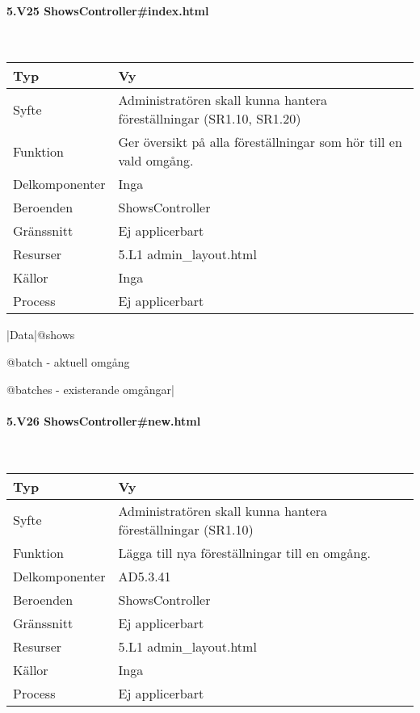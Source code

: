 \documentclass[a4paper, twoside, 11pt, titlepage]{article}
\begin{document}
			\paragraph{5.V25 ShowsController\#index.html}\

			\begin {table} [ht] \begin{tabular} {  p{3.5cm} p{9.6cm} }
				\hline
				Typ & Vy  \\
				\hline
				Syfte & Administratören skall kunna hantera föreställningar (SR1.10, SR1.20)  \\
				\hline
				Funktion & Ger översikt på alla föreställningar som hör till en vald omgång.  \\
				\hline
				Delkomponenter & Inga  \\
				\hline
				Beroenden & ShowsController  \\
				\hline
				Gränssnitt & Ej applicerbart  \\
				\hline
				Resurser & 5.L1 admin\_layout.html  \\
				\hline
				Källor & Inga  \\
				\hline
				Process & Ej applicerbart  \\
				\hline
			\end{tabular} \end{table} \FloatBarrier
			\vspace{6mm}

			|Data|@shows

			@batch - aktuell omgång

			@batches - existerande omgångar|

			\paragraph{5.V26 ShowsController\#new.html}\

			\begin {table} [ht] \begin{tabular} {  p{3.5cm} p{9.6cm} }
				\hline
				Typ & Vy  \\
				\hline
				Syfte & Administratören skall kunna hantera föreställningar (SR1.10)  \\
				\hline
				Funktion & Lägga till nya föreställningar till en omgång.  \\
				\hline
				Delkomponenter & AD5.3.41  \\
				\hline
				Beroenden & ShowsController  \\
				\hline
				Gränssnitt & Ej applicerbart  \\
				\hline
				Resurser & 5.L1 admin\_layout.html  \\
				\hline
				Källor & Inga  \\
				\hline
				Process & Ej applicerbart  \\
				\hline
			\end{tabular} \end{table} \FloatBarrier
			\vspace{6mm}
\end{document}
